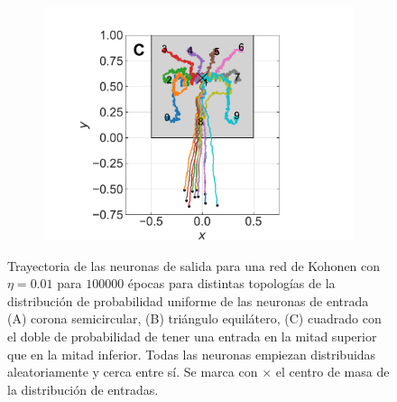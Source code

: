 \documentclass[11pt,twocolumn,twoside]{opticajnl}
\begin{document}
\begin{figure}[h]
\begin{subfigure}[b]{\linewidth}
            \includegraphics[width=\textwidth]{Figuras/cuad_pesos_sigma_0.1_epochs_100000_lr_0.01.pdf}
         \end{subfigure}
    \caption{Trayectoria de las neuronas de salida para una red de Kohonen con $\eta=0.01$ para $100000$ épocas para distintas topologías de la distribución de probabilidad uniforme de las neuronas de entrada (A) corona semicircular, (B) triángulo equilátero, (C) cuadrado con el doble de probabilidad de tener una entrada en la mitad superior que en la mitad inferior. Todas las neuronas empiezan distribuidas aleatoriamente y cerca entre sí. Se marca con $\times$ el centro de masa de la distribución de entradas.} 
    \label{fig:Kohonen_sigma_adp}
\end{figure}
\end{document}
